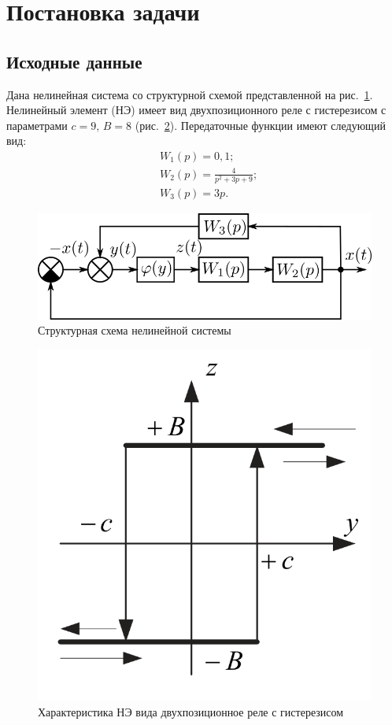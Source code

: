 


	
	
	\setcounter{page}{2}
	\tableofcontents
	\newpage
	
	\section{Постановка задачи}
	\subsection{Исходные данные}
	
	Дана нелинейная система со структурной схемой представленной на рис.~\ref{scheme}. Нелинейный элемент (НЭ) имеет вид двухпозиционного реле с гистерезисом с параметрами $c = 9,\,B=8$ (рис.~\ref{NE}). Передаточные функции имеют следующий вид:
	\begin{align*}
		&W_1(p) = 0,1; \\
		&W_2(p) = \frac{4}{p^2 + 3p + 9}; \\ 
		&W_3(p) = 3p.
	\end{align*}
	
	\begin{figure}[h]
		\centering\includegraphics[width=.8\textwidth]{png/схема.png}
		\caption{Структурная схема нелинейной системы}
		\label{scheme}
	\end{figure}
	\begin{figure}[h]
		\centering\includegraphics[width=.4\textwidth]{png/НЭ.png}
		\caption{Характеристика НЭ вида двухпозиционное реле с гистерезисом}
		\label{NE}
	\end{figure}
	
